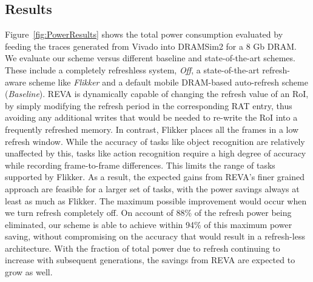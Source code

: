 \subsection{Results}
Figure~\ref{fig:PowerResults} shows the total power consumption evaluated by feeding the traces generated from Vivado into DRAMSim2 for a 8 Gb DRAM. We evaluate our scheme versus different baseline and state-of-the-art schemes. These include a completely refreshless system, \emph{Off}, a state-of-the-art refresh-aware scheme like \emph{Flikker} and a default mobile DRAM-based auto-refresh scheme (\emph{Baseline}). %
REVA is dynamically capable of changing the refresh value of an RoI, by simply modifying the refresh period in the corresponding RAT entry, thus avoiding any additional writes that would be needed to re-write the RoI into a frequently refreshed memory. In contrast, Flikker places all the frames in a low refresh window. While the accuracy of tasks like object recognition are relatively unaffected by this, tasks like action recognition require a high degree of accuracy while recording frame-to-frame differences. 
This limits the range of tasks supported by Flikker. As a result, the expected gains from REVA's finer grained approach are feasible for a larger set of tasks, with the power savings always at least as much as Flikker.
The maximum possible improvement would occur when we turn refresh completely off. On account of 88\% of the refresh power being eliminated, our scheme is able to achieve within 94\% of this maximum power saving, without compromising on the accuracy that would result in a refresh-less architecture. With the fraction of total power due to refresh continuing to increase with subsequent generations, the savings from REVA are expected to grow as well.


